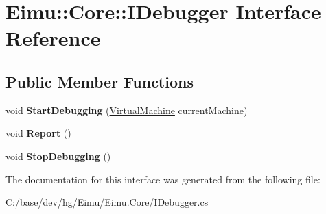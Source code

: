 \hypertarget{interface_eimu_1_1_core_1_1_i_debugger}{
\section{Eimu::Core::IDebugger Interface Reference}
\label{interface_eimu_1_1_core_1_1_i_debugger}
}
\subsection*{Public Member Functions}
\begin{DoxyCompactItemize}
\item 
\hypertarget{interface_eimu_1_1_core_1_1_i_debugger_a9970bf4e22110e4cbc56701e1059af31}{
void {\bfseries StartDebugging} (\hyperlink{class_eimu_1_1_core_1_1_virtual_machine}{VirtualMachine} currentMachine)}
\label{interface_eimu_1_1_core_1_1_i_debugger_a9970bf4e22110e4cbc56701e1059af31}

\item 
\hypertarget{interface_eimu_1_1_core_1_1_i_debugger_a30232c766320b346670f2bea96f6f6f1}{
void {\bfseries Report} ()}
\label{interface_eimu_1_1_core_1_1_i_debugger_a30232c766320b346670f2bea96f6f6f1}

\item 
\hypertarget{interface_eimu_1_1_core_1_1_i_debugger_a3de4ab34b375ebfbfb7af5c06619c0f7}{
void {\bfseries StopDebugging} ()}
\label{interface_eimu_1_1_core_1_1_i_debugger_a3de4ab34b375ebfbfb7af5c06619c0f7}

\end{DoxyCompactItemize}


The documentation for this interface was generated from the following file:\begin{DoxyCompactItemize}
\item 
C:/base/dev/hg/Eimu/Eimu.Core/IDebugger.cs\end{DoxyCompactItemize}
